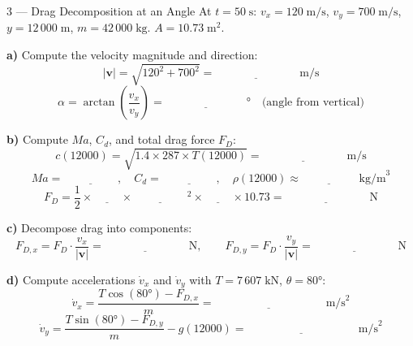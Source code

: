 \documentclass[12pt, a4paper]{article}
\begin{document}
\begin{solutionspace}[7cm]
\end{solutionspace}

\begin{exercisebox}{3 — Drag Decomposition at an Angle}
At $t = 50\;\text{s}$: $v_x = 120\;\text{m/s}$, $v_y = 700\;\text{m/s}$, $y = 12\,000\;\text{m}$, $m = 42\,000\;\text{kg}$.
$A = 10.73\;\text{m}^2$.

\textbf{a)} Compute the velocity magnitude and direction:
\[
  |\mathbf{v}| = \sqrt{120^2 + 700^2} = \underline{\hspace{3cm}}\;\text{m/s}
\]
\[
  \alpha = \arctan\!\left(\frac{v_x}{v_y}\right) = \underline{\hspace{3cm}}° \quad\text{(angle from vertical)}
\]

\textbf{b)} Compute $Ma$, $C_d$, and total drag force $F_D$:
\[
  c(12000) = \sqrt{1.4 \times 287 \times T(12000)} = \underline{\hspace{3cm}}\;\text{m/s}
\]
\[
  Ma = \underline{\hspace{2cm}}, \quad C_d = \underline{\hspace{2cm}}, \quad \rho(12000) \approx \underline{\hspace{2cm}}\;\text{kg/m}^3
\]
\[
  F_D = \frac{1}{2}\times\underline{\hspace{1cm}}\times\underline{\hspace{2cm}}^2\times\underline{\hspace{1cm}}\times 10.73 = \underline{\hspace{3cm}}\;\text{N}
\]

\textbf{c)} Decompose drag into components:
\[
  F_{D,x} = F_D\cdot\frac{v_x}{|\mathbf{v}|} = \underline{\hspace{3cm}}\;\text{N}, \qquad
  F_{D,y} = F_D\cdot\frac{v_y}{|\mathbf{v}|} = \underline{\hspace{3cm}}\;\text{N}
\]

\textbf{d)} Compute accelerations $\dot{v}_x$ and $\dot{v}_y$ with $T = 7\,607\;\text{kN}$, $\theta = 80°$:
\[
  \dot{v}_x = \frac{T\cos(80°) - F_{D,x}}{m} = \underline{\hspace{4cm}}\;\text{m/s}^2
\]
\[
  \dot{v}_y = \frac{T\sin(80°) - F_{D,y}}{m} - g(12000) = \underline{\hspace{4cm}}\;\text{m/s}^2
\]
\end{exercisebox}

\begin{solutionspace}[10cm]
\end{solutionspace}
\end{document}
